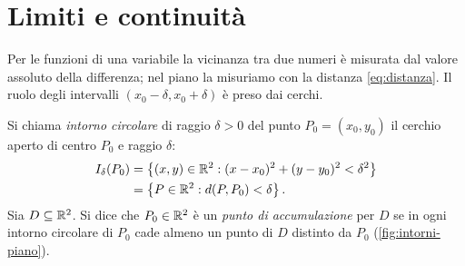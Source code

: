 \section{Limiti e continuità}
\label{sec:limiti-piano}

Per le funzioni di una variabile la vicinanza tra due numeri è misurata dal valore
assoluto della differenza; nel piano la misuriamo con la distanza
\eqref{eq:distanza}. Il ruolo degli intervalli $(x_{0}-\delta,x_{0}+\delta)$ è preso dai
cerchi.

\begin{definizione}\label{def:intorno-circolare}
Si chiama \emph{intorno circolare} di raggio $\delta>0$ del punto $P_{0}=(x_{0},y_{0})$ il
cerchio aperto di centro $P_{0}$ e raggio $\delta$:
\begin{equation}\label{eq:intorno-circolare}
\begin{split}
  I_{\delta}(P_{0})&=\left\{ (x,y)\in\mathbb{R}^{2} : (x-x_{0})^{2}+(y-y_{0})^{2}<\delta^{2} \right\}\\
  &=\left\{ P\in\mathbb{R}^{2} : d(P,P_{0})<\delta \right\}.
\end{split}
\end{equation}
Sia $D\subseteq\mathbb{R}^{2}$. Si dice che $P_{0}\in\mathbb{R}^{2}$ è un \emph{punto di accumulazione}
per $D$ se in ogni intorno circolare di $P_{0}$ cade almeno un punto di $D$ distinto da
$P_{0}$ (\cref{fig:intorni-piano}).
\end{definizione}

